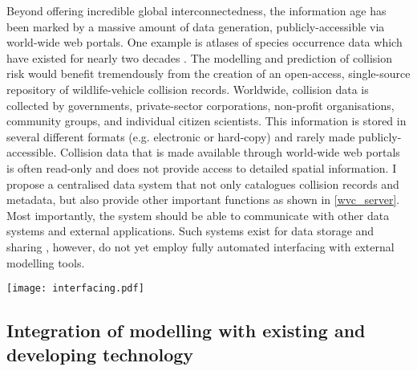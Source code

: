 Beyond offering incredible global interconnectedness, the information age has been marked by a massive amount of data generation, publicly-accessible via world-wide web portals. One example is atlases of species occurrence data which have existed for nearly two decades \citep{}. The modelling and prediction of collision risk would benefit tremendously from the creation of an open-access, single-source repository of wildlife-vehicle collision records. Worldwide, collision data is collected by governments, private-sector corporations, non-profit organisations, community groups, and individual citizen scientists. This information is stored in several different formats (e.g. electronic or hard-copy) and rarely made publicly-accessible. Collision data that is made available through world-wide web portals is often read-only and does not provide access to detailed spatial information. I propose a centralised data system that not only catalogues collision records and metadata, but also provide other important functions as shown in \cref{wvc_server}. Most importantly, the system should be able to communicate with other data systems and external applications. Such systems exist for data storage and sharing \citep{}, however, do not yet employ fully automated interfacing with external modelling tools.

\begin{figure*}[htp]
  \centering
  \texttt{[image: interfacing.pdf]}
  \caption[Centralised data collection and reporting system]{Schematic diagram of centralised data collection and reporting system for wildlife-vehicle collisions. Arrows indicate directions of information flow. Additional collection of collisions data (in blue) is by both citizen scientists (top) and professionals (bottom).}
  \label{wvc_server}
\end{figure*}


\subsection{Integration of modelling with existing and developing technology}

